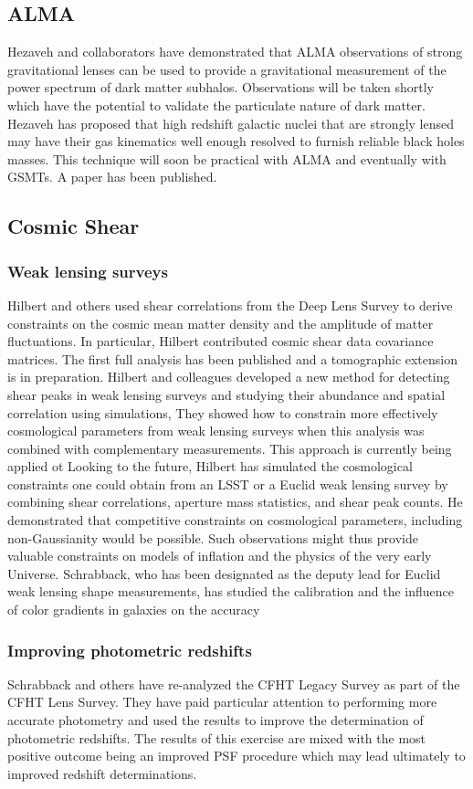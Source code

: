 \documentclass[psfig,11pt]{article}
\begin{document}
{\subsection{ALMA}
Hezaveh and collaborators have demonstrated that ALMA observations of  strong gravitational lenses can be used to provide a gravitational measurement of the power spectrum of dark matter subhalos. Observations will be taken shortly which have the potential to validate the particulate nature of dark matter. Hezaveh has proposed that high redshift galactic nuclei that are strongly lensed may have their gas kinematics well enough resolved to furnish reliable black holes masses.  This technique will soon be practical with ALMA and eventually with GSMTs. A paper has been published.
\subsection{Cosmic Shear}
\subsubsection{Weak lensing surveys}
Hilbert and others used shear correlations from the Deep Lens Survey to derive constraints on the cosmic mean matter density and the amplitude of matter fluctuations. In particular, Hilbert contributed cosmic shear data covariance matrices. The first full analysis has been published and a tomographic extension is in preparation. Hilbert and colleagues developed a new method for detecting shear peaks in weak lensing surveys and studying their abundance and spatial correlation using simulations, They showed how to constrain more effectively cosmological parameters from weak lensing surveys when this analysis was combined with complementary measurements. This approach is currently being applied ot
 Looking to the future, Hilbert has simulated the cosmological constraints one could obtain from an LSST or a Euclid weak lensing survey by combining shear correlations, aperture mass statistics, and shear peak counts. He demonstrated that competitive constraints on cosmological parameters, including non-Gaussianity would be possible. Such observations might thus provide valuable constraints on models of inflation and the physics of the very early Universe. Schrabback, who has been designated as the deputy lead for Euclid weak lensing shape measurements, has studied the calibration and the influence of color gradients in galaxies on the accuracy
\subsubsection{Improving photometric redshifts}
Schrabback and others have re-analyzed the CFHT Legacy Survey as part of the CFHT Lens Survey. They have paid particular attention to performing more accurate photometry and used the results to improve the determination of photometric redshifts. The results of this exercise are mixed with the most positive outcome being an improved PSF procedure which may lead ultimately to improved redshift determinations.
}
\end{document}
